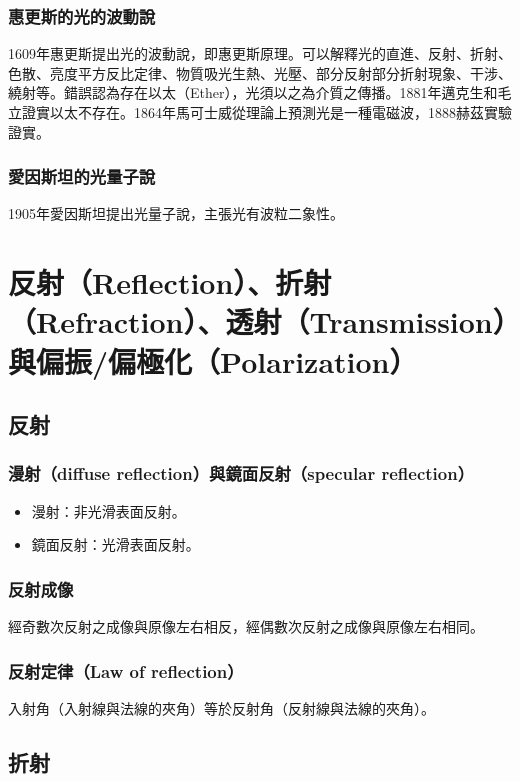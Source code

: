 \documentclass[a4paper,12pt]{report}
\begin{document}
\subsubsection{惠更斯的光的波動說}
1609年惠更斯提出光的波動說，即惠更斯原理。可以解釋光的直進、反射、折射、色散、亮度平方反比定律、物質吸光生熱、光壓、部分反射部分折射現象、干涉、繞射等。錯誤認為存在以太（Ether），光須以之為介質之傳播。1881年邁克生和毛立證實以太不存在。1864年馬可士威從理論上預測光是一種電磁波，1888赫茲實驗證實。
\subsubsection{愛因斯坦的光量子說}
1905年愛因斯坦提出光量子說，主張光有波粒二象性。


\section{反射（Reflection）、折射（Refraction）、透射（Transmission）與偏振/偏極化（Polarization）}
\subsection{反射}
\subsubsection{漫射（diffuse reflection）與鏡面反射（specular reflection）}
\begin{itemize}
\item 漫射：非光滑表面反射。
\item 鏡面反射：光滑表面反射。
\end{itemize}
\subsubsection{反射成像}
經奇數次反射之成像與原像左右相反，經偶數次反射之成像與原像左右相同。
\subsubsection{反射定律（Law of reflection）}
入射角（入射線與法線的夾角）等於反射角（反射線與法線的夾角）。
\subsection{折射}
\end{document}
